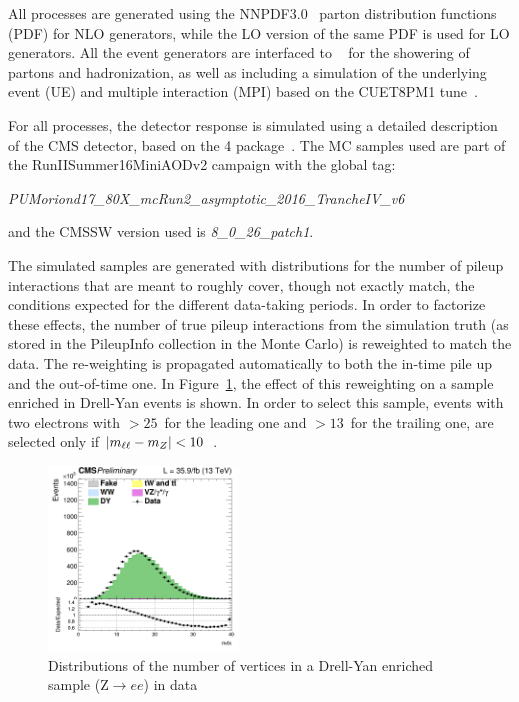 All processes are generated using the NNPDF3.0~\cite{Ball:2013hta,Ball:2011uy} parton distribution functions (PDF) for NLO generators,
while the LO version of the same PDF is used for LO generators. All the event generators are interfaced 
to ~\cite{Sjostrand:2007gs} for the showering of
partons and hadronization, as well as including a simulation of the underlying event (UE) and multiple interaction (MPI)
based on the CUET8PM1 tune~\cite{Khachatryan:2015pea}. 
%
%

For all processes, the detector response is simulated using a detailed
description of the CMS detector, based on the \GEANT{}4 package~\cite{Agostinelli:2002hh}. 
The MC samples used  are part of the RunIISummer16MiniAODv2 campaign with the global tag:
\begin{center} \emph{PUMoriond17\_80X\_mcRun2\_asymptotic\_2016\_TrancheIV\_v6} \end{center}
and the CMSSW version used is \emph{8\_0\_26\_patch1}.

The simulated samples are generated with distributions for the number of pileup interactions that are meant to roughly cover,
though not exactly match, the conditions expected for the different data-taking periods. In order to factorize these effects, 
the number of true pileup interactions from the simulation truth (as stored in the PileupInfo collection in the Monte Carlo)
is reweighted to match the data.
The re-weighting is propagated automatically to both the in-time pile up and the out-of-time one.
In Figure~\ref{Fig:pu}, the effect of this reweighting on a sample enriched in Drell-Yan events is shown.
In order to select this sample, 
events with two electrons with \pt$> 25$~\GeV for the leading one and  \pt$>
13$~\GeV for the trailing one, are selected only if  $|m_{\ell\ell} - m_Z| < 10$~\GeV. 

\begin{figure}[htbp]
\centering
\includegraphics[width=0.45\textwidth]{../AN/Figs/nvertices.png}
\caption{
    Distributions of the number of vertices in a Drell-Yan enriched sample
    (Z$\rightarrow{}ee$) in
    data}
    \label{Fig:pu}
\end{figure}

